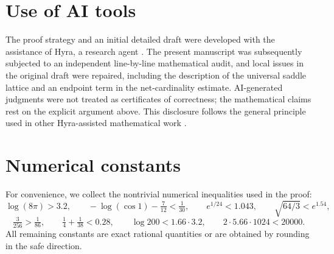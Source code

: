 \documentclass[11pt,reqno]{amsart}
\theoremstyle{plain}
\theoremstyle{definition}
\theoremstyle{remark}
\begin{document}
\section{Use of AI tools}

The proof strategy and an initial detailed draft were developed with the
assistance of Hyra, a research agent \cite{hyra2026}. The present manuscript
was subsequently subjected to an independent line-by-line mathematical audit,
and local issues in the original draft were repaired, including the description
of the universal saddle lattice and an endpoint term in the net-cardinality
estimate. AI-generated judgments were not treated as certificates of
correctness; the mathematical claims rest on the explicit argument above. This
disclosure follows the general principle used in other Hyra-assisted
mathematical work \cite{LinLi2026}.

\appendix
\section{Numerical constants}

For convenience, we collect the nontrivial numerical inequalities used in the
proof:
\[
  \log(8\pi)>3.2,\qquad
  -\log(\cos1)-\tfrac7{12}<\tfrac1{30},\qquad
  e^{1/24}<1.043,\qquad
  \sqrt{64/3}<e^{1.54},
\]
\[
  \tfrac3{256}>\tfrac1{86},\qquad
  \tfrac14+\tfrac1{38}<0.28,\qquad
  \log200<1.66\cdot3.2,\qquad
  2\cdot5.66\cdot1024<20000.
\]
All remaining constants are exact rational quantities or are obtained by
rounding in the safe direction.



\end{document}
